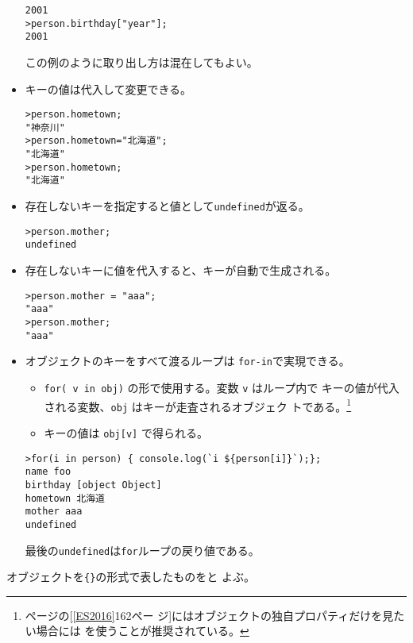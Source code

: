 \begin{Exec}
\begin{itemize}
\begin{Verbatim}
2001
>person.birthday["year"];
2001
\end{Verbatim}
この例のように取り出し方は混在してもよい。
 \item キーの値は代入して変更できる。
\begin{Verbatim}
>person.hometown;
"神奈川"
>person.hometown="北海道";
"北海道"
>person.hometown;
"北海道"
\end{Verbatim}
 \item 存在しないキーを指定すると値として\Verb+undefined+が返る。
\begin{Verbatim}
>person.mother;
undefined
\end{Verbatim}
 \item 存在しないキーに値を代入すると、キーが自動で生成される。
\begin{Verbatim}
>person.mother = "aaa";
"aaa"
>person.mother;
"aaa"
\end{Verbatim}
 \item オブジェクトのキーをすべて渡るループは \verb+for-in+で実現できる。
\begin{itemize}
 \item \verb+for( v in obj)+ の形で使用する。変数 \verb+v+ はループ内で
       キーの値が代入される変数、\verb+obj+ はキーが走査されるオブジェク
       トである。\footnote{\pageref{ES2016}ページの[\ref{ES2016}162ペー
       ジ]にはオブジェクトの独自プロパティだけを見たい場合には
       を使うことが推奨されている。}
 \item キーの値は \verb+obj[v]+ で得られる。
\end{itemize}
\begin{Verbatim}
>for(i in person) { console.log(`i ${person[i]}`);};
name foo
birthday [object Object]
hometown 北海道
mother aaa
undefined
\end{Verbatim}
最後の\Verb+undefined+は\Verb+for+ループの戻り値である。
\end{itemize}
\end{Exec}
オブジェクトを\Verb+{}+の形式で表したものをと
よぶ。
